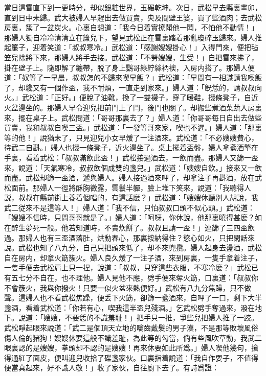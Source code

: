 當日這雪直下到一更時分，却似銀粧世界，玉碾乾坤。次日，武松早去縣裏畫卯，直到日中未歸。武大被婦人早趕出去做買賣，央及間壁王婆，買了些酒肉；去武松房裏，簇了一盆炭火。心裏自想道：「我今日着實撩鬦他一鬦，不怕他不動情！」那婦人獨自冷冷清清立在簾兒下，望見武松正在雪裏踏着那亂瓊碎玉歸來。婦人推起簾子，迎着笑道：「叔叔寒冷。」武松道：「感謝嫂嫂掛心！」入得門來，便把毡笠兒除將下來，那婦人將手去接。武松道：「不勞嫂嫂，生受！」自把雪來拂了，掛在壁子上。隨即解了纏帶，脱了身上鸚哥綠紵絲衲襖，入房内搭了。那婦人便道：「奴等了一早晨，叔叔怎的不歸來喫早飯？」武松道：「早間有一相識請我喫飯了，却纔又有一個作盃，我不耐煩，一直走到家來。」婦人道：「旣恁的，請叔叔向火。」武松道：「正好。」便脫了油靴，換了一雙襪子，穿了暖鞋，掇條凳子，自近火盆邊坐的。那婦人早令迎兒把前門上了閂，後門也關了。却搬些煮酒菜蔬入房裏來，擺在桌子上。武松問道：「哥哥那裏去了？」婦人道：「你哥哥每日自出去做些買賣，我和叔叔自喫三盃。」武松道：「一發等哥來家，喫也不遲。」婦人道：「那裏等的他！」說猶未了，只見迎兒小女早煖了一注酒來。武松道：「不必嫂嫂費心，待武二自斟。」婦人也掇一條凳子，近火邊坐了。桌上擺着盃盤，婦人拿盞酒擎在手裏，看着武松：「叔叔滿飲此盃！」武松接過酒去，一飲而盡。那婦人又篩一盃來，說道：「天氣寒冷，叔叔飲個成雙的盞兒。」武松道：「嫂嫂自飲。」接來又一飲而盡。武松却篩一盃酒，遞與婦人。婦人接過酒來呷了，却拿注子再斟酒，放在武松面前。那婦人一徑將酥胸微露，雲鬟半軃，臉上堆下笑來，說道：「我聽得人説，叔叔在縣前街上養着個唱的，有這話麽？」武松道：「嫂嫂休聽別人胡說，我武二従來不是這等人！」婦人道：「我不信，只怕叔叔口頭不似心頭。」武松道：「嫂嫂不信時，只問哥哥就是了。」婦人道：「呵呀，你休說，他那裏曉得甚麽？如在醉生夢死一般。他若知道時，不賣炊餅了。叔叔且請一盃！」連篩了三四盃飲過。那婦人也有三盃酒落肚，烘動春心，那裏按納得住？慾心如火，只把閑話來說。武松也知了八九分，自己只把頭來低了，却不來兜攬。婦人起身去盪酒，武松自在房内，却拿火筯簇火。婦人良久煖了一注子酒，來到房裏，一隻手拿着注子，一隻手便去武松肩上只一捏，說道：「叔叔，只穿這些衣服，不寒冷麽？」武松已有五七分不自在，也不理他。婦人見他不應，劈手便來奪火筯，口裏道：「叔叔你不會簇火，我與你撥火！只要一似火盆來熱便好。」武松有八九分焦躁，只不做聲。這婦人也不看武松焦躁，便丢下火筯，卻篩一盞酒來，自呷了一口，剩下大半盞酒，看着武松道：「你若有心，喫我這半盃兒殘酒。」乞武松劈手奪過來，潑在地下。說道：「嫂嫂，不要恁的不識羞耻！」把手只一推，爭些兒把婦人推了一跤。武松睜起眼來說道：「武二是個頂天立地的噙齒戴髮的男子漢，不是那等敗壞風俗傷人倫的猪狗！嫂嫂休要這般不識羞耻，為此等的勾當，倘有些風吹草動，我武二眼裏認的是嫂嫂，拳頭却不認的是嫂嫂！再來休要如此所爲。」婦人喫他幾句，搶得通紅了面皮，便叫迎兒收拾了碟盞家伙。口裏指着說道：「我自作耍子，不值得便當真起來，好不識人敬！」收了家伙，自往廚下去了。有詩爲證：

